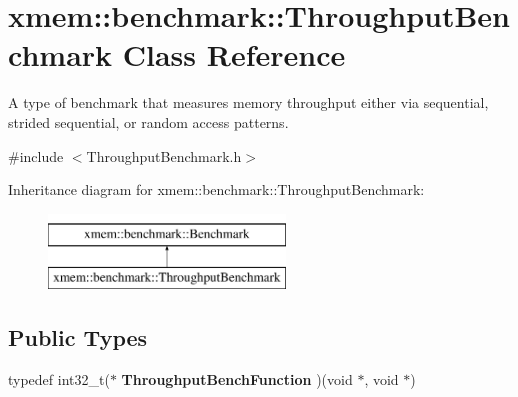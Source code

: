 \hypertarget{classxmem_1_1benchmark_1_1_throughput_benchmark}{\section{xmem\-:\-:benchmark\-:\-:Throughput\-Benchmark Class Reference}
\label{classxmem_1_1benchmark_1_1_throughput_benchmark}
}


A type of benchmark that measures memory throughput either via sequential, strided sequential, or random access patterns.  




{\ttfamily \#include $<$Throughput\-Benchmark.\-h$>$}

Inheritance diagram for xmem\-:\-:benchmark\-:\-:Throughput\-Benchmark\-:\begin{figure}[H]
\begin{center}
\leavevmode
\includegraphics[height=2.000000cm]{classxmem_1_1benchmark_1_1_throughput_benchmark}
\end{center}
\end{figure}
\subsection*{Public Types}
\begin{DoxyCompactItemize}
\item 
\hypertarget{classxmem_1_1benchmark_1_1_throughput_benchmark_a75983bee8799b756b32ea68cb7a9bcb1}{typedef int32\-\_\-t($\ast$ {\bfseries Throughput\-Bench\-Function} )(void $\ast$, void $\ast$)}\label{classxmem_1_1benchmark_1_1_throughput_benchmark_a75983bee8799b756b32ea68cb7a9bcb1}

\end{DoxyCompactItemize}
